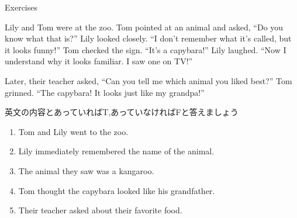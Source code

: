 \documentclass[aspectratio=169,xcolor={dvipsnames,table}]{beamer}
\begin{document}
\begin{frame}[plain]{Exercises}
\small
\begin{tcolorbox}[colframe=ForestGreen,
  colback=ForestGreen!10!white,
  colbacktitle=ForestGreen!40!white,
  coltitle=black, %
  before upper={\setlength{\parindent}{1.5em}},
  title=英文を読んで、問に答えましょう\hfill{\scriptsize \myaudio{./audio/055_indirect_question_06.mp3}}
]
Lily and Tom were at the zoo.
Tom pointed at an animal and asked, ``Do you know what that is?''
Lily looked closely. ``I don't remember what it's called, but it looks funny!''
Tom checked the sign. ``It's a capybara!''
Lily laughed. ``Now I understand why it looks familiar. I saw one on TV!''

Later, their teacher asked, ``Can you tell me which animal you liked best?''
Tom grinned. ``The capybara! It looks just like my grandpa!''
\end{tcolorbox}
{\scriptsize 英文の内容とあっていればT,あっていなければFと答えましょう}
\vspace{-3pt}
\begin{enumerate}\scriptsize\setlength{\itemsep}{-2pt}
 \item<2-> Tom and Lily went to the zoo.\hfill{}
 \item<2-> Lily immediately remembered the name of the animal.\hfill{}
 \item<2-> The animal they saw was a kangaroo.\hfill{}
 \item<2-> Tom thought the capybara looked like his grandfather.\hfill{}
 \item<2-> Their teacher asked about their favorite food.\hfill{}

\end{enumerate}

\end{frame}
\end{document}
